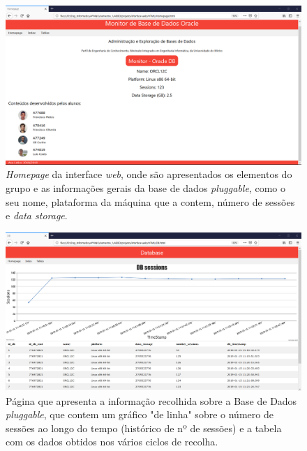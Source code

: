 \documentclass[a4paper]{article}
\begin{document}
\begin{figure}[H]
\centering
\includegraphics[scale=0.4]{html/homepage.png}
\caption{\emph{Homepage} da interface \emph{web}, onde são apresentados os elementos do grupo e as informações gerais da base de dados \emph{pluggable}, como o seu nome, plataforma da máquina que a contem, número de sessões e \emph{data storage}.}
\end{figure}

\begin{figure}[H]
\centering
\includegraphics[scale=0.4]{html/db.png}
\caption{Página que apresenta a informação recolhida sobre a Base de Dados \emph{pluggable}, que contem um gráfico "de linha" sobre o número de sessões ao longo do tempo (histórico de nº de sessões) e a tabela com os dados obtidos nos vários ciclos de recolha.}
\end{figure}
\end{document}
